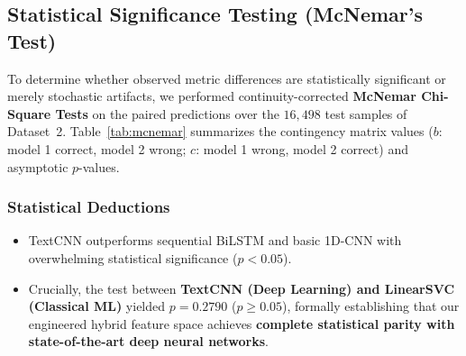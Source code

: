 \documentclass[conference]{IEEEtran}
\begin{document}
\subsection{Statistical Significance Testing (McNemar's Test)}
\label{subsec:mcnemar}
To determine whether observed metric differences are statistically significant or merely stochastic artifacts, we performed continuity-corrected \textbf{McNemar Chi-Square Tests} on the paired predictions over the $16,498$ test samples of Dataset~2. Table~\ref{tab:mcnemar} summarizes the contingency matrix values ($b$: model 1 correct, model 2 wrong; $c$: model 1 wrong, model 2 correct) and asymptotic $p$-values.

\begin{table}[htbp]
\caption{McNemar Significance Tests ($N = 16{,}498$ Test Samples).}
\label{tab:mcnemar}
\centering
{}
\end{table}

\subsubsection{Statistical Deductions}
\begin{itemize}
    \item TextCNN outperforms sequential BiLSTM and basic 1D-CNN with overwhelming statistical significance ($p < 0.05$).
    \item Crucially, the test between \textbf{TextCNN (Deep Learning) and LinearSVC (Classical ML)} yielded $p = 0.2790$ ($p \ge 0.05$), formally establishing that our engineered hybrid feature space achieves \textbf{complete statistical parity with state-of-the-art deep neural networks}.
\end{itemize}
\end{document}
